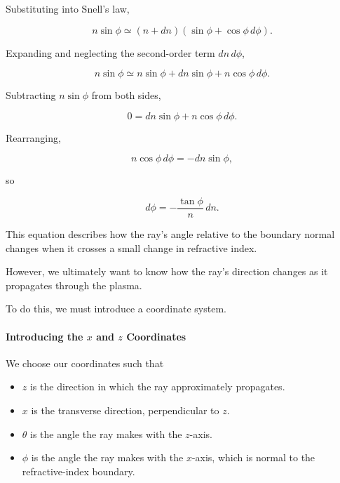 Substituting into Snell's law,

\begin{equation}
n\sin\phi
\simeq
(n+dn)(\sin\phi+\cos\phi\,d\phi).
\end{equation}

Expanding and neglecting the second-order
term $dn\,d\phi$,

\begin{equation}
n\sin\phi
\simeq
n\sin\phi
+dn\sin\phi
+n\cos\phi\,d\phi.
\end{equation}

Subtracting $n\sin\phi$ from both sides,

\begin{equation}
0=dn\sin\phi+n\cos\phi\,d\phi.
\end{equation}

Rearranging,

\begin{equation}
n\cos\phi\,d\phi=-dn\sin\phi,
\end{equation}

so

\begin{equation}
\boxed{
d\phi=-\frac{\tan\phi}{n}\,dn.
}
\end{equation}

This equation describes how the ray's angle relative
to the boundary normal changes when it crosses a
small change in refractive index.

However, we ultimately want to know how the ray's
direction changes as it propagates through the plasma.

To do this, we must introduce a coordinate system.

\paragraph{Introducing the $x$ and $z$ Coordinates}

We choose our coordinates such that

\begin{itemize}
    \item $z$ is the direction in which the ray
    approximately propagates.
    \item $x$ is the transverse direction,
    perpendicular to $z$.
    \item $\theta$ is the angle the ray makes
    with the $z$-axis.
    \item $\phi$ is the angle the ray makes
    with the $x$-axis, which is normal to
    the refractive-index boundary.
\end{itemize}

